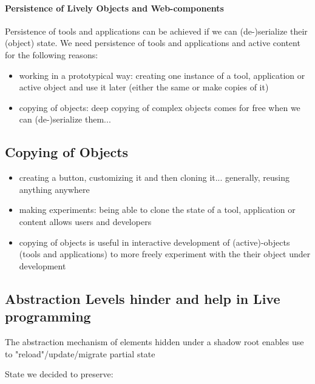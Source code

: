 \paragraph{Persistence of Lively Objects and Web-components}

Persistence of tools and applications can be achieved if we can (de-)serialize their (object) state. We need persistence of tools and applications and active content for the following reasons:

\begin{itemize}
  \item working in a prototypical way: creating one instance of a tool, application or active object and use it later (either the same or make copies of it)
  \item copying of objects: deep copying of complex objects comes for free when we can (de-)serialize them... 
\end{itemize}





\subsection{Copying of Objects}

\begin{itemize}
  \item creating a button, customizing it and then cloning it... generally, reusing anything anywhere
  \item making experiments: being able to clone the state of a tool, application or content allows users and developers 
  \item copying of objects is useful in interactive development of (active)-objects (tools and applications) to more freely experiment with the their object under development %
\end{itemize}

\subsection{Abstraction Levels hinder and help in Live programming}

The abstraction mechanism of elements hidden under a shadow root enables use to "reload"/update/migrate partial state

State we decided to preserve:

